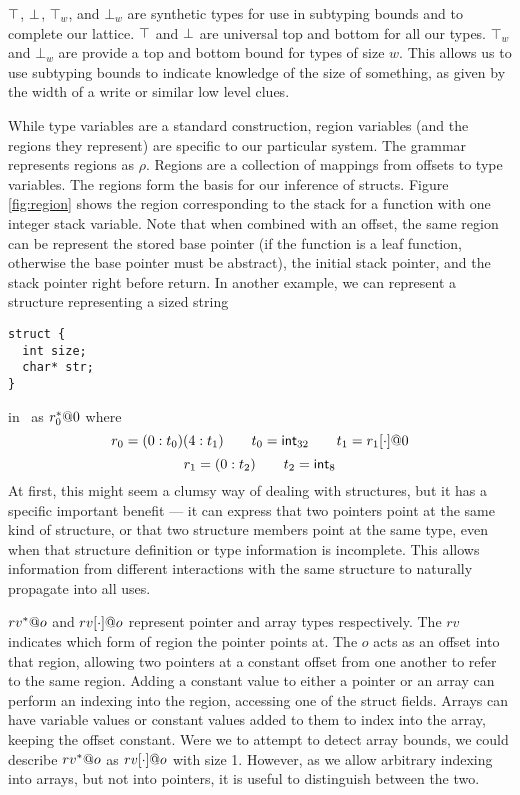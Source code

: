$\top$, $\bot$, $\top_{w}$, and $\bot_{w}$ are synthetic types for use in subtyping bounds and to complete our lattice. $\top$ and $\bot$ are universal top and bottom for all our types. $\top_{w}$ and $\bot_{w}$ are provide a top and bottom bound for types of size $w$. This allows us to use subtyping bounds to indicate knowledge of the size of something, as given by the width of a write or similar low level clues.

While type variables are a standard construction, region variables (and the regions they represent) are specific to our particular system.
The grammar represents regions as $\rho$.
Regions are a collection of mappings from offsets to type variables.
The regions form the basis for our inference of structs. Figure \ref{fig:region} shows the region corresponding to the stack for a function with one integer stack variable. Note that when combined with an offset, the same region can be represent the stored base pointer (if the function is a leaf function, otherwise the base pointer must be abstract), the initial stack pointer, and the stack pointer right before return. In another example, we can represent a structure representing a sized string
\begin{verbatim}
struct {
  int size;
  char* str;
}
\end{verbatim}
 in \bitr\ as $r_0^*@0$ where
$$r_0 = (0 : t_0) (4 : t_1) \qquad t_0 = \mathsf{int}_{32} \qquad t_1 = r_1[\cdot]@0$$
$$r_1 = (0 : t_2) \qquad t_2 = \mathsf{int}_{8}$$
At first, this might seem a clumsy way of dealing with structures, but it has a specific important benefit --- it can express that two pointers point at the same kind of structure, or that two structure members point at the same type, even when that structure definition or type information is incomplete. This allows information from different interactions with the same structure to naturally propagate into all uses.

$rv^*@o$ and $rv[\cdot]@o$ represent pointer and array types respectively. The $rv$ indicates which form of region the pointer points at. The $o$ acts as an offset into that region, allowing two pointers at a constant offset from one another to refer to the same region. Adding a constant value to either a pointer or an array can perform an indexing into the region, accessing one of the struct fields. Arrays can have variable values or constant values added to them to index into the array, keeping the offset constant. Were we to attempt to detect array bounds, we could describe $rv^*@o$ as $rv[\cdot]@o$ with size 1. However, as we allow arbitrary indexing into arrays, but not into pointers, it is useful to distinguish between the two.

